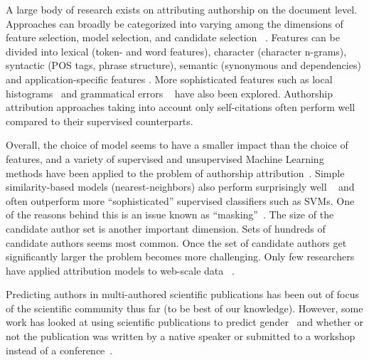 
A large body of research exists on attributing authorship on the document level. 
Approaches can broadly be categorized into varying among the dimensions of feature selection, model selection, and candidate selection ~\cite{stamatatos2009survey}. 
Features can be divided into lexical (token- and word features), character (character n-grams), syntactic (POS tags, phrase structure), semantic (synonymous and dependencies) and application-specific features \cite{stamatatos2009survey}. 
More sophisticated features such as local histograms~\cite{escalante2011local} and grammatical errors ~\cite{koppel2003exploiting} have also been explored. 
Authorship attribution approaches taking into account only self-citations often perform well ~\cite{hill2003myth} compared to their supervised counterparts. 

Overall, the choice of model seems to have a smaller impact than the choice of features, and a variety of supervised and unsupervised Machine Learning methods have been applied to the problem of authorship attribution~\cite{stamatatos2009survey}. 
Simple similarity-based models (nearest-neighbors) also perform surprisingly well ~\cite{koppel2012fundamental} and often outperform more ``sophisticated'' supervised classifiers such as SVMs. 
One of the reasons behind this is an issue known as ``masking''~\cite{narayanan2012feasibility}. The size of the candidate author set is another important dimension. Sets of hundreds of candidate authors seems most common. Once the set of candidate authors get significantly larger the problem becomes more challenging. Only few researchers have applied attribution models to web-scale data ~\cite{narayanan2012feasibility}. 

Predicting authors in multi-authored scientific publications has been out of focus of the scientific community thus far (to be best of our knowledge).
However, some work has looked at using scientific publications to predict gender~\cite{sarawgi2011gender,bergsma2012stylometric} and whether or not the publication was written by a native speaker or submitted to a workshop instead of a conference~\cite{bergsma2012stylometric}.


